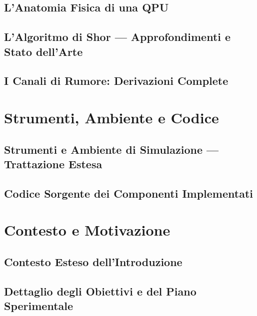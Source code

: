 \documentclass[oneside, 12pt]{report}
\begin{document}
\section{L'Anatomia Fisica di una QPU}
\label{app:anatomia}

\section{L'Algoritmo di Shor --- Approfondimenti e Stato dell'Arte}
\label{app:shor_esteso}

\section{I Canali di Rumore: Derivazioni Complete}
\label{app:canali}


\chapter{Strumenti, Ambiente e Codice}
\label{app:strumentiecodice}
\section{Strumenti e Ambiente di Simulazione --- Trattazione Estesa}
\label{app:strumenti}

\section{Codice Sorgente dei Componenti Implementati}
\label{app:codice}


\chapter{Contesto e Motivazione}
\label{app:contesto}
\section{Contesto Esteso dell'Introduzione}
\label{app:introduzione}

\section{Dettaglio degli Obiettivi e del Piano Sperimentale}
\label{app:obiettivi}

\end{document}
